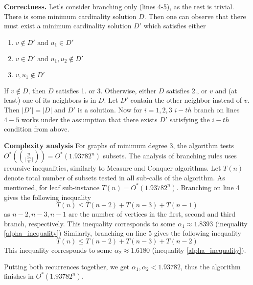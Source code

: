 \textbf{Correctness.} Let's consider branching only (lines 4-5), as the rest is trivial. There is some minimum cardinality solution $D$. Then one can observe that there must exist a minimum cardinality solution $D'$ which satisfies either
\begin{enumerate}
    \item $v \notin D' \text{ and } u_1 \in D'$
    \item $v \in D' \text{ and } u_1, u_2 \notin D'$
    \item $v, u_1 \notin D'$
\end{enumerate}
If $v \notin D$, then $D$ satisfies 1. or 3. Otherwise, either $D$ satisfies 2., or $v$ and (at least) one of its neighbors is in $D$. Let $D'$ contain the other neighbor instead of $v$. Then $|D'| = |D|$ and $D'$ is a solution. Now for $i = 1,2,3$ $i-th$ branch on lines $4-5$ works under the assumption that there exists $D'$ satisfying the $i-th$ condition from above.  
\par\textbf{Complexity analysis}
For graphs of minimum degree 3, the algorithm tests $O^*(\binom{n}{\lfloor\frac{3n}{8}\rfloor}) = O^*(1.93782^n)$ subsets. The analysis of branching rules uses recursive inequalities, similarly to Measure and Conquer algorithms. Let $T(n)$ denote total number of subsets tested in all sub-calls of the algorithm. As mentioned, for leaf sub-instance $T(n) = O^*(1.93782^n)$. Branching on line 4 gives the following inequality
$$
T(n) \leq T(n-2) + T(n-3) + T(n-1)
$$
as $n-2, n-3, n-1$ are the number of vertices in the first, second and third branch, respectively. This inequality corresponds to some $\alpha_1 \approx 1.8393$ (inequality \eqref{alpha_inequality})
Similarly, branching on line 5 gives the following inequality
$$
T(n) \leq T(n-2) + T(n-3) + T(n-2)
$$
This inequality corresponds to some $\alpha_2 \approx 1.6180$ (inequality \eqref{alpha_inequality}).

Putting both recurrences together, we get $\alpha_1, \alpha_2 < 1.93782$, thus the algorithm finishes in $O^*(1.93782^n)$.
